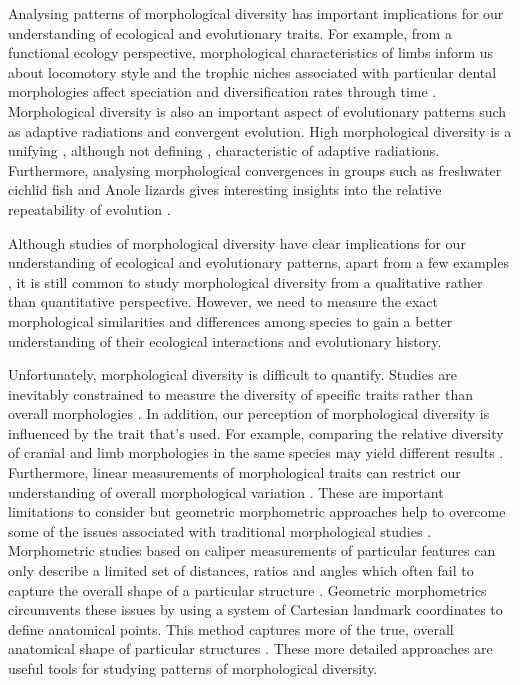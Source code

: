 	Analysing patterns of morphological diversity has important implications for our understanding of ecological and evolutionary traits. For example, from a functional ecology perspective, morphological characteristics of limbs inform us about locomotory style \citep[e.g.][]{Bou1987} and the trophic niches associated with particular dental morphologies affect speciation and diversification rates through time \citep{Price2012}. Morphological diversity is also an important aspect of evolutionary patterns such as adaptive radiations and convergent evolution. High morphological diversity is a unifying \citep{Losos2010a, Olson2009}, although not defining \citep{Glor2010, Olson2009}, characteristic of adaptive radiations. Furthermore, analysing morphological convergences in groups such as freshwater cichlid fish \citep{Muschick2012} and Anole lizards \citep{Mahler2013} gives interesting insights into the relative repeatability of evolution \citep{Losos2011}.


	Although studies of morphological diversity have clear implications for our understanding of ecological and evolutionary patterns, apart from a few examples \citep[e.g.][]{Ruta2013, Goswami2011, Brusatte2008}, it is still common to study morphological diversity from a qualitative rather than quantitative perspective. However, we need to measure the exact morphological similarities and differences among species to gain a better understanding of their ecological interactions and evolutionary history.


	Unfortunately, morphological diversity is difficult to quantify. Studies are inevitably constrained to measure the diversity of specific traits rather than overall morphologies \citep{Roy1997}. In addition, our perception of morphological diversity is influenced by the trait that's used. For example, comparing the relative diversity of cranial and limb morphologies in the same species may yield different results \citep{Foth2012}. Furthermore, linear measurements of morphological traits can restrict our understanding of overall morphological variation \citep{Rohlf1993}. These are important limitations to consider but geometric morphometric approaches help to overcome some of the issues associated with traditional morphological studies \citep{Adams2004}. Morphometric studies based on caliper measurements of particular features can only describe a limited set of distances, ratios and angles which often fail to capture the overall shape of a particular structure \citep{Slice2007}. Geometric morphometrics circumvents these issues by using a system of Cartesian landmark coordinates to define anatomical points. This method captures more of the true, overall anatomical shape of particular structures \citep{Mitteroecker2009}. These more detailed approaches are useful tools for studying patterns of morphological diversity.
	
